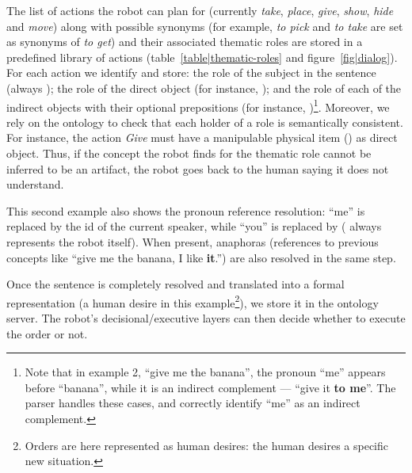 The list of actions the robot can plan for (currently \emph{take},
\emph{place}, \emph{give}, \emph{show}, \emph{hide} and \emph{move}) along with
possible synonyms (for example, \emph{to pick} and \emph{to take} are set as
synonyms of \emph{to get}) and their associated thematic roles are stored in a
predefined library of actions (table~\ref{table|thematic-roles} and
figure~\ref{fig|dialog}).  For each action we identify and store: the role of
the subject in the sentence (always ); the role of the
direct object (for instance, ); and the role of each of
the indirect objects with their optional prepositions (for instance,
)\footnote{Note that in example 2, ``give me the banana'',
the pronoun ``me'' appears before ``banana'', while it is an indirect
complement --- ``give it {\bf to me}''. The parser handles these cases, and
correctly identify ``me'' as an indirect complement.}. Moreover, we rely on the
ontology to check that each holder of a role is semantically consistent. For
instance, the action \emph{Give} must have a manipulable physical item
() as direct object. Thus, if the concept the robot finds for
the thematic role  cannot be inferred to be an artifact,
the robot goes back to the human saying it does not understand.

This second example  also shows the pronoun reference resolution: ``me'' is
replaced by the id of the current speaker, while ``you'' is replaced by
 ( always represents the robot itself). When
present, anaphoras (references to previous concepts like ``give me the banana,
I like {\bf it}.'') are also resolved in the same step.

Once the sentence is completely resolved and translated into a formal
representation (a human desire in this example\footnote{Orders are here
represented as human desires: the human desires a specific new situation.}), we
store it in the ontology server. The robot's decisional/executive layers can
then decide whether to execute the order or not. 

